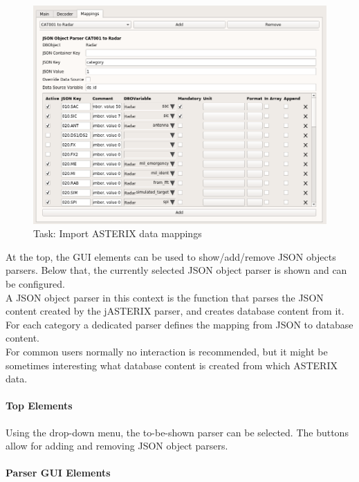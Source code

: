 \begin{figure}[H]
  \center
    \includegraphics[width=16cm,frame]{../screenshots/asterix_import_data_mappings.png}
  \caption{Task: Import ASTERIX data mappings}
\end{figure}

At the top, the GUI elements can be used to show/add/remove JSON objects parsers. Below that, the currently selected JSON object parser is shown and can be configured. \\

A JSON object parser in this context is the function that parses the JSON content created by the jASTERIX parser, and creates database content from it. For each category a dedicated parser defines the mapping from JSON to database content. \\

For common users normally no interaction is recommended, but it might be sometimes interesting what database content is created from which ASTERIX data.

\paragraph{Top Elements}

Using the drop-down menu, the to-be-shown parser can be selected. The buttons allow for adding and removing JSON object parsers.

\paragraph{Parser GUI Elements}

